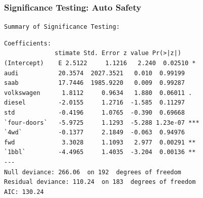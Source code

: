 \documentclass{beamer}
\begin{document}
\begin{frame}[fragile]
\frametitle{Significance Testing: Auto Safety}

\texttt{Summary of Significance Testing:}\\
\tiny{
\begin{verbatim}
Coefficients:
              stimate Std. Error z value Pr(>|z|)    
(Intercept)    E 2.5122     1.1216   2.240  0.02510 *  
audi           20.3574  2027.3521   0.010  0.99199    
saab           17.7446  1985.9220   0.009  0.99287    
volkswagen      1.8112     0.9634   1.880  0.06011 .  
diesel         -2.0155     1.2716  -1.585  0.11297    
std            -0.4196     1.0765  -0.390  0.69668    
`four-doors`   -5.9725     1.1293  -5.288 1.23e-07 ***
`4wd`          -0.1377     2.1849  -0.063  0.94976    
fwd             3.3028     1.1093   2.977  0.00291 ** 
`1bbl`         -4.4965     1.4035  -3.204  0.00136 ** 
---
Null deviance: 266.06  on 192  degrees of freedom
Residual deviance: 110.24  on 183  degrees of freedom
AIC: 130.24
\end{verbatim}
}
\end{frame}

\author[Q \& A]{
Christopher Patton, \texttt{cjpatton@ucdavis.edu}\\
Alex Rumbaugh, \texttt{aprumbaugh@ucdavis.edu}\\
Thomas Provan,\texttt{tcprovan@ucdavis.edu}\\
Olga Prilepova, \texttt{prilepova@gmail.com}\\
John Chen, \texttt{jhochen@ucdavis.edu}}

\begin{frame}
\titlepage
\end{frame}
\end{document}
